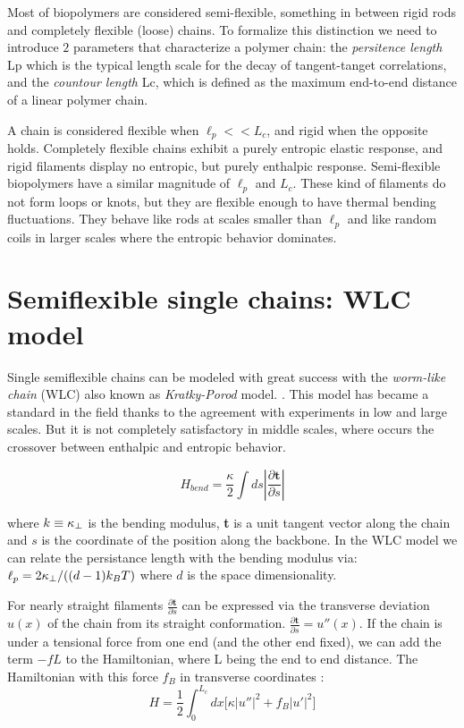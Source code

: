 Most of biopolymers are considered semi-flexible, something in between
rigid rods and completely flexible (loose) chains.  To formalize this
distinction we need to introduce $2$ parameters that characterize a polymer
chain: the \emph{persitence length} \gls{Lp} which is the typical length scale
for the decay of tangent-tanget correlations, and the \emph{countour length}
\gls{Lc}, which is defined as the maximum end-to-end distance of a linear
polymer chain.

A chain is considered flexible when $\ell_p<<L_c$, and rigid when the opposite
holds. Completely flexible chains exhibit a purely entropic elastic
response, and rigid filaments display no entropic, but purely enthalpic
response. Semi-flexible biopolymers have a similar magnitude of $\ell_p$ and
$L_c$. These kind of filaments do not form loops or knots, but they are
flexible enough to have thermal bending
fluctuations\citep{storm_nonlinear_2005}. They behave like rods at scales
smaller than $\ell_p$ and like random coils in larger scales where the entropic behavior
dominates.

\section{Semiflexible single chains: WLC model}
Single semiflexible chains can be modeled with great success with the
\emph{worm-like chain} (WLC) also known as \emph{Kratky-Porod} model.
\citep{rubinstein_polymer_2003, schuster_hierarchical_2011}. This model has
became a standard in the field thanks to the agreement with experiments in low
and large scales.
But it is not completely satisfactory in middle scales, where occurs the
crossover between enthalpic and entropic behavior.\citet{hsu_breakdown_2011}

$$H_{bend}=\frac{\kappa}{2} \int ds|\frac{\partial \textbf{t}}{\partial s}|$$

where $k\equiv\kappa_\perp{}$ is the bending modulus, \textbf{t} is a unit tangent
vector along the chain and $s$ is the coordinate of the position along the
backbone. In the WLC model we can relate the persistance length with the bending
modulus via: $\ell_p{}=2\kappa_\perp{}/((d-1)k_B{}T)$ where $d$ is the space
dimensionality.

For nearly straight filaments $\frac{\partial \textbf{t}}{\partial s}$ can be
expressed via the transverse deviation $u(x)$ of the chain from its straight
conformation. $\frac{\partial \textbf{t}}{\partial s}=u''(x)$. If the chain is
under a tensional force from one end (and the other end fixed), we can add the
term $-fL$ to the Hamiltonian, where L being the end to end distance. The
Hamiltonian with this force $f_B$ in transverse coordinates :
\begin{equation}\label{WLC_H}
H=\frac{1}{2}\int_0^{L_c} dx\Big[\kappa|u''|^2 + f_B|u'|^2\Big]
\end{equation}

